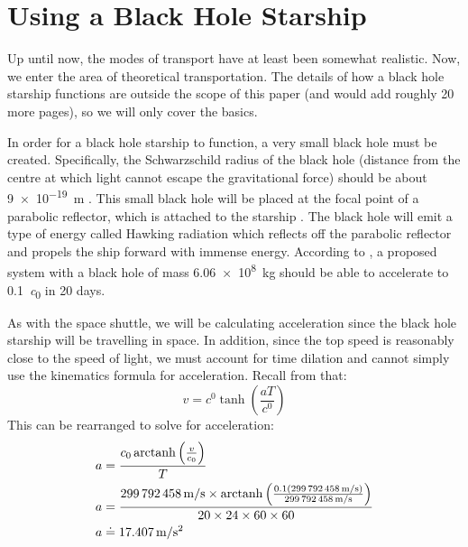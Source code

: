\section{Using a Black Hole Starship}
	Up until now, the modes of transport have at least been somewhat realistic.
	Now, we enter the area of theoretical transportation. The details of how a black hole starship functions are outside the scope of this paper (and would add roughly 20 more pages), so we will only cover the basics.
	
	In order for a black hole starship to function, a very small black hole must be created.
	Specifically, the Schwarzschild radius of the black hole (distance from the centre at which light cannot escape the gravitational force) should be about \SI{9e-19}{\metre} \autocite{blackHoleStarship}.
	This small black hole will be placed at the focal point of a parabolic reflector, which is attached to the starship \autocite{blackHoleStarship}.
	The black hole will emit a type of energy called Hawking radiation which reflects off the parabolic reflector and propels the ship forward with immense energy.
	According to \cite{blackHoleStarship}, a proposed system with a black hole of mass \SI{6.06e8}{\kg} should be able to accelerate to \SI{0.1}{\clight} in 20 days. 
	
	As with the space shuttle, we will be calculating acceleration since the black hole starship will be travelling in space.
	In addition, since the top speed is reasonably close to the speed of light, we must account for time dilation and cannot simply use the kinematics formula for acceleration.
	Recall from \cite{sracceleration} that:
	\[v = \si{\clight} \tanh \left(\frac{aT}{\si{\clight}}\right)\]
	This can be rearranged to solve for acceleration:
	\begin{align*}
		a &= \frac{\si{\clight} \arctanh \left(\frac{v}{\si{\clight}}\right)}{T}\\
		a &= \frac{\SI{299792458}{\metre/\second} \times \arctanh \left(\frac{0.1(\SI{299792458}{\metre/\second})}{\SI{299792458}{\metre/\second}}\right)}{20 \times 24 \times 60 \times 60}\\
		a &\doteq \SI{17.407}{\metre/\second^2}
	\end{align*}
